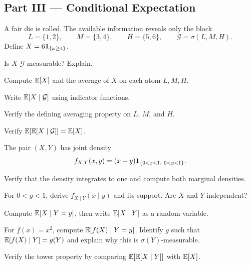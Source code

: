 \subsection*{Part III --- Conditional Expectation}

\begin{exercise}
A fair die is rolled. The available information reveals only the block
\[
L=\{1,2\},\qquad M=\{3,4\},\qquad H=\{5,6\},
\qquad \mathcal G=\sigma(L,M,H).
\]
Define $X=6\mathbf{1}_{\{\omega\geq4\}}$.
\begin{exparts}
  \item Is $X$ $\mathcal G$-measurable? Explain.
  \item Compute $\mathbb{E}[X]$ and the average of $X$ on each atom $L,M,H$.
  \item Write $\mathbb{E}[X\mid\mathcal G]$ using indicator functions.
  \item Verify the defining averaging property on $L$, $M$, and $H$.
  \item Verify $\mathbb{E}[\mathbb{E}[X\mid\mathcal G]]=\mathbb{E}[X]$.
\end{exparts}
\end{exercise}

\begin{exercise}
The pair $(X,Y)$ has joint density
\[
f_{X,Y}(x,y)=(x+y)\1_{\{0<x<1,\ 0<y<1\}}.
\]
\begin{exparts}
  \item Verify that the density integrates to one and compute both marginal densities.
  \item For $0<y<1$, derive $f_{X\mid Y}(x\mid y)$ and its support. Are
  $X$ and $Y$ independent?
  \item Compute $\mathbb{E}[X\mid Y=y]$, then write $\mathbb{E}[X\mid Y]$ as a random variable.
  \item For $f(x)=x^2$, compute $\mathbb{E}[f(X)\mid Y=y]$. Identify $g$ such that
  $\mathbb{E}[f(X)\mid Y]=g(Y)$ and explain why this is $\sigma(Y)$-measurable.
  \item Verify the tower property by comparing $\mathbb{E}[\mathbb{E}[X\mid Y]]$ with $\mathbb{E}[X]$.
\end{exparts}
\end{exercise}

